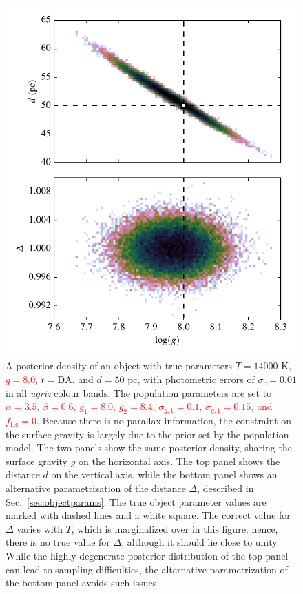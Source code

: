 \documentclass[fleqn,usenatbib]{mnras}
\newcommand{\changes}[1]{\textcolor{red}{#1}}
\newcommand{\Teff}{T}
\newcommand{\logg}{g}
\begin{document}
\begin{figure}
	\includegraphics[width=\columnwidth]{banana.pdf}
    \caption{A posterior density of an object with true parameters $\Teff=14000$ K, \changes{$\logg=8.0$}, $t=\text{DA}$, and $d=50$ pc, with photometric errors of $\sigma_c=0.01$ in all \emph{ugriz} colour bands. The population parameters are set to \changes{$\alpha=3.5$, $\beta=0.6$, $\bar{g}_1=8.0$, $\bar{g}_2=8.4$, $\sigma_{g,1}=0.1$, $\sigma_{g,1}=0.15$, and $f_\text{He}=0$}. Because there is no parallax information, the constraint on the surface gravity is largely due to the prior set by the population model. The two panels show the same posterior density, sharing the surface gravity $\logg$ on the horizontal axis. The top panel shows the distance $d$ on the vertical axis, while the bottom panel shows an alternative parametrization of the distance $\Delta$, described in Sec.~\ref{sec:objectparams}. The true object parameter values are marked with dashed lines and a white square. The correct value for $\Delta$ varies with $\Teff$, which is marginalized over in this figure; hence, there is no true value for $\Delta$, although it should lie close to unity. While the highly degenerate posterior distribution of the top panel can lead to sampling difficulties, the alternative parametrization of the bottom panel avoids such issues.}
    \label{fig:banana}
\end{figure}
\end{document}
